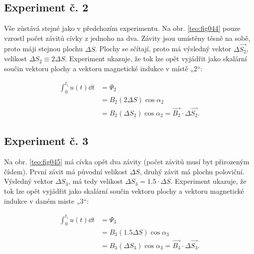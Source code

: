       \subsection{Experiment č. 2}
        Vše zůstává stejné jako v předchozím experimentu. Na obr. \ref{teo:fig044} pouze vzrostl
        počet závitů cívky z jednoho na dva. Závity jsou umístěny těsně na sobě, proto máji stejnou
        plochu \(\Delta S\). Plochy se sčítají, proto má výsledný vektor \(\Delta \vec{S_2}\),
        velikost \(\Delta S_2\equiv2\Delta S\). Experiment ukazuje, že tok lze opět vyjádřit jako
        skalární součin vektoru plochy a vektoru magnetické indukce v místě „2“:

        
        \begin{align}
          \int_0^{t_i} u(t)\dd{t} 
             &= \Psi_2                                               \nonumber \\                
             &= B_2(2\Delta S)\cos\alpha_2                           \nonumber \\
             &= B_2(\Delta S_2)\cos\alpha_2 
              = \vec{B_2}\cdot\Delta\vec{S_2}.                       \label{TEO:eq080}
        \end{align}

      \subsection{Experiment č. 3}
        Na obr. \ref{teo:fig045} má cívka opět dva závity (počet závitů musí byt přirozeným číslem).
        První závit má původní velikost \(\Delta S\), druhý závit má plochu poloviční. Výsledný
        vektor \(\Delta S_3\), má tedy velikost \(\Delta S_3 = \num{1.5}\cdot\Delta S\). Experiment
        ukazuje, že tok lze opět vyjádřit jako skalární součin vektoru plochy a vektoru magnetické
        indukce v daném miste „3“:


        \begin{align}
          \int_0^{t_i} u(t)\dd{t} 
            &= \Psi_3                                              \nonumber  \\
            &= B_3(\num{1.5}\Delta S)\cos\alpha_3                  \nonumber  \\
            &= B_3(\Delta S_3)\cos\alpha_3 
             = \vec{B_3}\cdot\Delta\vec{S_3}.                      \label{TEO:eq081}
        \end{align}
         
